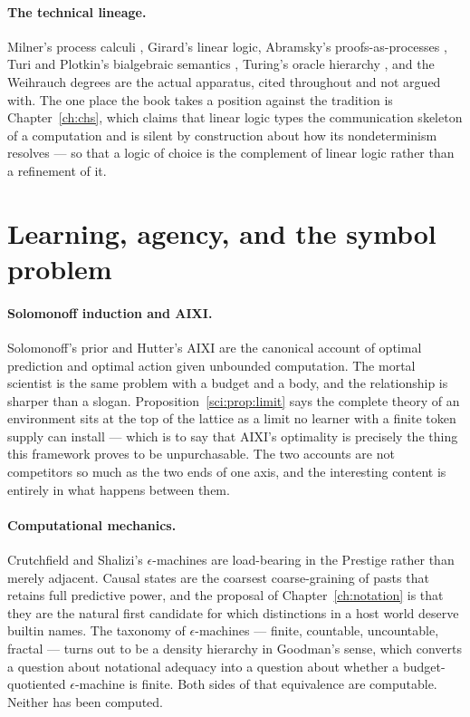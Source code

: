 \paragraph{The technical lineage.}
Milner's process calculi \cite{milnerCC}, Girard's linear logic,
Abramsky's proofs-as-processes \cite{abramskyPaP}, Turi and
Plotkin's bialgebraic semantics \cite{turiplotkin}, Turing's oracle
hierarchy \cite{turing1939}, and the Weihrauch degrees
\cite{weihrauch} are the actual apparatus, cited throughout and not
argued with.
The one place the book takes a position against the tradition is
Chapter~\ref{ch:chs}, which claims that linear logic types the
communication skeleton of a computation and is silent by
construction about how its nondeterminism resolves --- so that a
logic of choice is the complement of linear logic rather than a
refinement of it.

\section*{Learning, agency, and the symbol problem}

\paragraph{Solomonoff induction and AIXI.}
Solomonoff's prior \cite{solomonoff1964} and Hutter's AIXI
\cite{hutter2005} are the canonical account of optimal prediction
and optimal action given unbounded computation.
The mortal scientist is the same problem with a budget and a body,
and the relationship is sharper than a slogan.
Proposition~\ref{sci:prop:limit} says the complete theory of an
environment sits at the top of the lattice as a limit no learner
with a finite token supply can install --- which is to say that
AIXI's optimality is precisely the thing this framework proves to
be unpurchasable.
The two accounts are not competitors so much as the two ends of one
axis, and the interesting content is entirely in what happens
between them.

\paragraph{Computational mechanics.}
Crutchfield and Shalizi's $\epsilon$-machines
\cite{shalizi2001} are load-bearing in the Prestige rather than
merely adjacent.
Causal states are the coarsest coarse-graining of pasts that
retains full predictive power, and the proposal of
Chapter~\ref{ch:notation} is that they are the natural first
candidate for which distinctions in a host world deserve builtin
names.
The taxonomy of $\epsilon$-machines --- finite, countable,
uncountable, fractal --- turns out to be a density hierarchy in
Goodman's sense, which converts a question about notational
adequacy into a question about whether a budget-quotiented
$\epsilon$-machine is finite.
Both sides of that equivalence are computable.
Neither has been computed.

